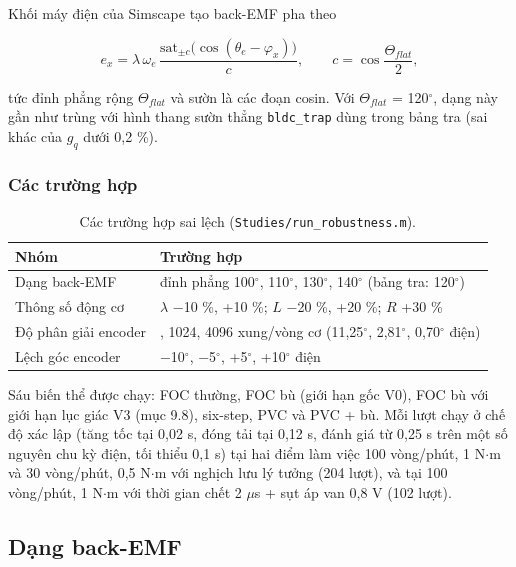 Khối máy điện của Simscape tạo back-EMF pha theo

\begin{equation}
e_x = \lambda\,\omega_e\,\frac{\mathrm{sat}_{\pm c}\big(\cos(\theta_e - \varphi_x)\big)}{c}, \qquad c = \cos\frac{\Theta_{flat}}{2},
\tag{10.2}\label{eq:10.2}
\end{equation}

tức đỉnh phẳng rộng $\Theta_{flat}$ và sườn là các đoạn cosin. Với $\Theta_{flat}$ = 120$^\circ$, dạng này gần như trùng với hình thang sườn thẳng \texttt{bldc\_trap} dùng trong bảng tra (sai khác của $g_q$ dưới 0,2 \%).

\subsubsection{Các trường hợp}\label{sec:10.1.2}


\begin{table}[H]
\centering\small
\caption{Các trường hợp sai lệch (\texttt{Studies/run\_robustness.m}).}\label{tab:10.1}
\begin{tabularx}{\linewidth}{@{}l>{\raggedright\arraybackslash}X@{}}
\toprule
Nhóm & Trường hợp \\ \midrule
Dạng back-EMF & đỉnh phẳng 100$^\circ$, 110$^\circ$, 130$^\circ$, 140$^\circ$ (bảng tra: 120$^\circ$) \\
Thông số động cơ & $\lambda$ −10 \%, +10 \%; $L$ −20 \%, +20 \%; $R$ +30 \% \\
Độ phân giải encoder & 256, 1024, 4096 xung/vòng cơ (11,25$^\circ$, 2,81$^\circ$, 0,70$^\circ$ điện) \\
Lệch góc encoder & −10$^\circ$, −5$^\circ$, +5$^\circ$, +10$^\circ$ điện \\
\bottomrule
\end{tabularx}
\end{table}

Sáu biến thể được chạy: FOC thường, FOC bù (giới hạn gốc V0), FOC bù với giới hạn lục giác V3 (mục 9.8), six-step, PVC và PVC + bù. Mỗi lượt chạy ở chế độ xác lập (tăng tốc tại 0,02 s, đóng tải tại 0,12 s, đánh giá từ 0,25 s trên một số nguyên chu kỳ điện, tối thiểu 0,1 s) tại hai điểm làm việc 100 vòng/phút, 1 N$\cdot$m và 30 vòng/phút, 0,5 N$\cdot$m với nghịch lưu lý tưởng (204 lượt), và tại 100 vòng/phút, 1 N$\cdot$m với thời gian chết 2 $\mu$s + sụt áp van 0,8 V (102 lượt).

\subsection{Dạng back-EMF}\label{sec:10.2}


